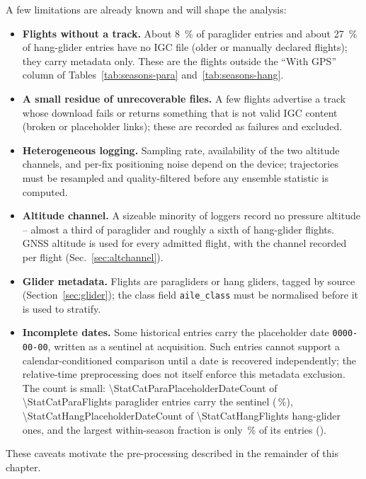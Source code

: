 A few limitations are already known and will shape the analysis:
\begin{itemize}
  \item \textbf{Flights without a track.} About \SI{8}{\percent} of paraglider entries and
        about \SI{27}{\percent} of hang-glider entries have no IGC file (older or manually
        declared flights); they carry metadata only. These are the flights outside the
        \enquote{With GPS} column of Tables~\ref{tab:seasons-para}
        and~\ref{tab:seasons-hang}.
  \item \textbf{A small residue of unrecoverable files.} A few flights advertise a track
        whose download fails or returns something that is not valid IGC content
        (broken or placeholder links); these are recorded as failures and excluded.
  \item \textbf{Heterogeneous logging.} Sampling rate, availability of the two altitude
        channels, and per-fix positioning noise depend
        on the device; trajectories must be resampled and quality-filtered before any
        ensemble statistic is computed.
  \item \textbf{Altitude channel.} A sizeable minority of loggers record no
        pressure altitude -- almost a third of paraglider and roughly a sixth of hang-glider
        flights. GNSS altitude is used for every admitted flight, with the channel
        recorded per flight (Sec.~\ref{sec:altchannel}).
  \item \textbf{Glider metadata.} Flights are paragliders or hang gliders, tagged by source
        (Section~\ref{sec:glider}); the class field \texttt{aile\_class} must be normalised
        before it is used to stratify.
  \item \textbf{Incomplete dates.} Some historical entries carry the placeholder date
        \texttt{0000-00-00}, written as a sentinel at acquisition. Such entries cannot
        support a calendar-conditioned comparison until a date is recovered independently;
        the relative-time preprocessing does not itself enforce this metadata exclusion.
        The count is small: \num{\StatCatParaPlaceholderDateCount} of
        \num{\StatCatParaFlights} paraglider entries carry the sentinel
        (\StatCatParaPlaceholderDatePct\,\%), \num{\StatCatHangPlaceholderDateCount} of
        \num{\StatCatHangFlights} hang-glider ones, and the largest within-season fraction is
        only \StatCatParaPlaceholderWorstPct\,\% of its entries
        (\StatCatParaPlaceholderWorstSeason).
\end{itemize}
These caveats motivate the pre-processing described in the remainder of this chapter.

